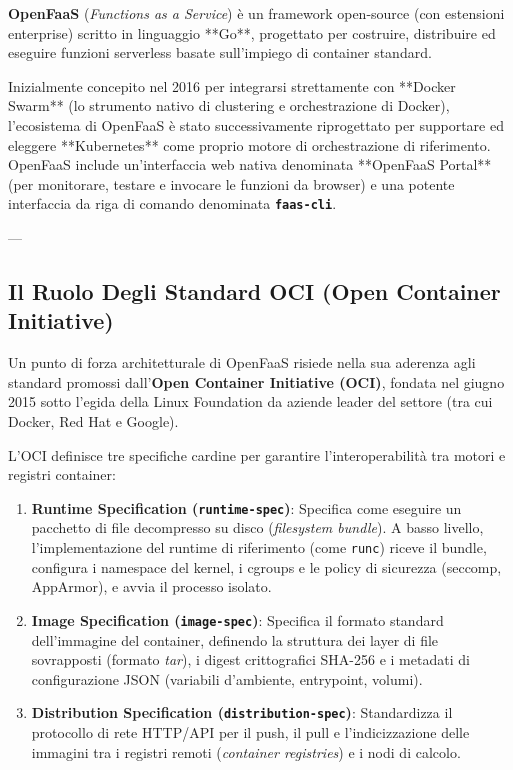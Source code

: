 \documentclass[11pt, a4paper]{article}
\begin{document}
\textbf{OpenFaaS} (\emph{Functions as a Service}) è un framework open-source (con estensioni enterprise) scritto in linguaggio **Go**, progettato per costruire, distribuire ed eseguire funzioni serverless basate sull'impiego di container standard.

Inizialmente concepito nel 2016 per integrarsi strettamente con **Docker Swarm** (lo strumento nativo di clustering e orchestrazione di Docker), l'ecosistema di OpenFaaS è stato successivamente riprogettato per supportare ed eleggere **Kubernetes** come proprio motore di orchestrazione di riferimento. OpenFaaS include un'interfaccia web nativa denominata **OpenFaaS Portal** (per monitorare, testare e invocare le funzioni da browser) e una potente interfaccia da riga di comando denominata \textbf{\texttt{faas-cli}}.

---

\subsection{Il Ruolo Degli Standard OCI (Open Container Initiative)}

Un punto di forza architetturale di OpenFaaS risiede nella sua aderenza agli standard promossi dall'\textbf{Open Container Initiative (OCI)}, fondata nel giugno 2015 sotto l'egida della Linux Foundation da aziende leader del settore (tra cui Docker, Red Hat e Google).

L'OCI definisce tre specifiche cardine per garantire l'interoperabilità tra motori e registri container:
\begin{enumerate}[noitemsep]
    \item \textbf{Runtime Specification (\texttt{runtime-spec})}: Specifica come eseguire un pacchetto di file decompresso su disco (\emph{filesystem bundle}). A basso livello, l'implementazione del runtime di riferimento (come \texttt{runc}) riceve il bundle, configura i namespace del kernel, i cgroups e le policy di sicurezza (seccomp, AppArmor), e avvia il processo isolato.
    \item \textbf{Image Specification (\texttt{image-spec})}: Specifica il formato standard dell'immagine del container, definendo la struttura dei layer di file sovrapposti (formato \emph{tar}), i digest crittografici SHA-256 e i metadati di configurazione JSON (variabili d'ambiente, entrypoint, volumi).
    \item \textbf{Distribution Specification (\texttt{distribution-spec})}: Standardizza il protocollo di rete HTTP/API per il push, il pull e l'indicizzazione delle immagini tra i registri remoti (\emph{container registries}) e i nodi di calcolo.
\end{enumerate}
\end{document}
